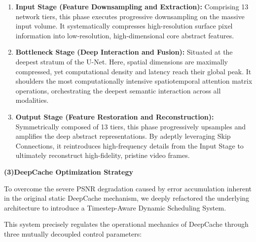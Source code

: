 \begin{enumerate}[label=(\arabic*), leftmargin=*]
    \item[1)] \textbf{Input Stage (Feature Downsampling and Extraction):} Comprising 13 network tiers, this phase executes progressive downsampling on the massive input volume. It systematically compresses high-resolution surface pixel information into low-resolution, high-dimensional core abstract features.

    \item[2)]  \textbf{Bottleneck Stage (Deep Interaction and Fusion):} Situated at the deepest stratum of the U-Net. Here, spatial dimensions are maximally compressed, yet computational density and latency reach their global peak. It shoulders the most computationally intensive spatiotemporal attention matrix operations, orchestrating the deepest semantic interaction across all modalities.

    \item[3)]  \textbf{Output Stage (Feature Restoration and Reconstruction):} Symmetrically composed of 13 tiers, this phase progressively upsamples and amplifies the deep abstract representations. By adeptly leveraging Skip Connections, it reintroduces high-frequency details from the Input Stage to ultimately reconstruct high-fidelity, pristine video frames.
\end{enumerate}

\textbf{(3)DeepCache Optimization Strategy}

To overcome the severe PSNR degradation caused by error accumulation inherent in the original static DeepCache mechanism, we deeply refactored the underlying architecture to introduce a Timestep-Aware Dynamic Scheduling System.

This system precisely regulates the operational mechanics of DeepCache through three mutually decoupled control parameters:

